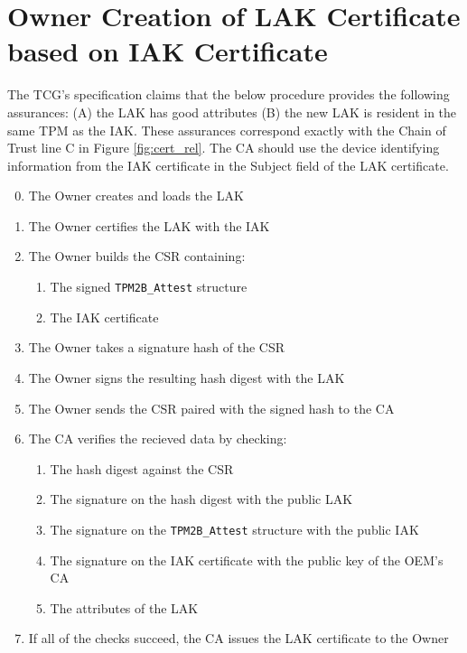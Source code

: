 \section{Owner Creation of LAK Certificate based on IAK Certificate}

The TCG's specification claims that the below procedure provides the following assurances: (A) the LAK has good attributes (B) the new LAK is resident in the same TPM as the IAK. These assurances correspond exactly with the Chain of Trust line C in Figure \ref{fig:cert_rel}. The CA should use the device identifying information from the IAK certificate in the Subject field of the LAK certificate.
\begin{enumerate}[itemsep=0pt,parsep=0pt,partopsep=0pt]
  \setcounter{enumi}{-1}
  \item The Owner creates and loads the LAK
  \item The Owner certifies the LAK with the IAK
  \item The Owner builds the CSR containing:
  \begin{enumerate}[topsep=0pt, itemsep=0pt,parsep=0pt,partopsep=0pt]
    \item The signed \verb|TPM2B_Attest| structure
    \item The IAK certificate
  \end{enumerate}
  \item The Owner takes a signature hash of the CSR
  \item The Owner signs the resulting hash digest with the LAK
  \item The Owner sends the CSR paired with the signed hash to the CA
  \item The CA verifies the recieved data by checking:
  \begin{enumerate}[topsep=0pt, itemsep=0pt,parsep=0pt,partopsep=0pt]
    \item The hash digest against the CSR
    \item The signature on the hash digest with the public LAK
    \item The signature on the \verb|TPM2B_Attest| structure with the public IAK
    \item The signature on the IAK certificate with the public key of the OEM's CA
    \item The attributes of the LAK
  \end{enumerate}
  \item If all of the checks succeed, the CA issues the LAK certificate to the Owner
\end{enumerate}


